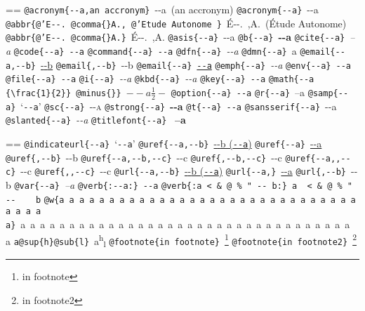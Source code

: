 \documentclass{book}
\makeatletter
\newcommand\Texinfocommandstyletextcite[1]{{\normalfont{}\textsl{#1}}}%
\newcommand\Texinfocommandstyletextkbd[1]{{\ttfamily\textsl{#1}}}%
\newcommand\Texinfocommandstyletextvar[1]{{\normalfont{}\textsl{#1}}}%
\newenvironment{Texinfopreformatted}{%
  \par\GNUTobeylines\obeyspaces\frenchspacing\parskip=\z@\parindent=\z@}{}
{\catcode`\^^M=13 \gdef\GNUTobeylines{\catcode`\^^M=13 \def^^M{\null\par}}}
\newenvironment{Texinfoindented}{\begin{list}{}{}\item\relax}{\end{list}}
\renewcommand{\_}{\Texinfounderscore\discretionary{}{}{}}
\makeatother
\begin{document}
\begin{Texinfoindented}
\begin{Texinfopreformatted}
\texttt{@acronym\{{-}{-}a,an accronym\}}\ {-}{-}a\ (an accronym)
\texttt{@acronym\{{-}{-}a\}}\ {-}{-}a
\texttt{@abbr\{@'E{-}{-}.\ @comma\{\}A.,\ @'Etude Autonome \}}\ \'{E}{-}{-}.\@\ ,A.\@\ (\'{E}tude Autonome)
\texttt{@abbr\{@'E{-}{-}.\ @comma\{\}A.\}}\ \'{E}{-}{-}.\@\ ,A.\@
\texttt{@asis\{{-}{-}a\}}\ {-}{-}a
\texttt{@b\{{-}{-}a\}}\ \textbf{{-}{-}a}
\texttt{@cite\{{-}{-}a\}}\ \Texinfocommandstyletextcite{--a}
\texttt{@code\{{-}{-}a\}}\ \texttt{{-}{-}a}
\texttt{@command\{{-}{-}a\}}\ \texttt{{-}{-}a}
\texttt{@dfn\{{-}{-}a\}}\ \textsl{{-}{-}a}
\texttt{@dmn\{{-}{-}a\}}\ \thinspace {-}{-}a
\texttt{@email\{{-}{-}a,{-}{-}b\}}\ \href{mailto:--a}{{-}{-}b}
\texttt{@email\{,{-}{-}b\}}\ {-}{-}b
\texttt{@email\{{-}{-}a\}}\ \href{mailto:--a}{\nolinkurl{--a}}
\texttt{@emph\{{-}{-}a\}}\ \emph{{-}{-}a}
\texttt{@env\{{-}{-}a\}}\ \texttt{{-}{-}a}
\texttt{@file\{{-}{-}a\}}\ \texttt{{-}{-}a}
\texttt{@i\{{-}{-}a\}}\ \textit{{-}{-}a}
\texttt{@kbd\{{-}{-}a\}}\ \Texinfocommandstyletextkbd{{-}{-}a}
\texttt{@key\{{-}{-}a\}}\ \texttt{{-}{-}a}
\texttt{@math\{{-}{-}a \{\textbackslash{}frac\{1\}\{2\}\}\ @minus\{\}\}}\ $--a {\frac{1}{2}} -$
\texttt{@option\{{-}{-}a\}}\ \texttt{{-}{-}a}
\texttt{@r\{{-}{-}a\}}\ \textnormal{--a}
\texttt{@samp\{{-}{-}a\}}\ `\texttt{{-}{-}a}'
\texttt{@sc\{{-}{-}a\}}\ \textsc{{-}{-}a}
\texttt{@strong\{{-}{-}a\}}\ \textbf{{-}{-}a}
\texttt{@t\{{-}{-}a\}}\ \texttt{{-}{-}a}
\texttt{@sansserif\{{-}{-}a\}}\ \textsf{{-}{-}a}
\texttt{@slanted\{{-}{-}a\}}\ \textsl{{-}{-}a}
\texttt{@titlefont\{{-}{-}a\}}\ \end{Texinfopreformatted}
{\huge \bfseries --a}\begin{Texinfopreformatted}%
\ttfamily 
\texttt{@indicateurl\{{-}{-}a\}}\ `\texttt{{-}{-}a}'
\texttt{@uref\{{-}{-}a,{-}{-}b\}}\ \href{--a}{{-}{-}b (\nolinkurl{--a})}
\texttt{@uref\{{-}{-}a\}}\ \url{--a}
\texttt{@uref\{,{-}{-}b\}}\ {-}{-}b
\texttt{@uref\{{-}{-}a,{-}{-}b,{-}{-}c\}}\ {-}{-}c
\texttt{@uref\{,{-}{-}b,{-}{-}c\}}\ {-}{-}c
\texttt{@uref\{{-}{-}a{,}{,}{-}{-}c\}}\ {-}{-}c
\texttt{@uref\{{,}{,}{-}{-}c\}}\ {-}{-}c
\texttt{@url\{{-}{-}a,{-}{-}b\}}\ \href{--a}{{-}{-}b (\nolinkurl{--a})}
\texttt{@url\{{-}{-}a,\}}\ \url{--a}
\texttt{@url\{,{-}{-}b\}}\ {-}{-}b
\texttt{@var\{{-}{-}a\}}\ \Texinfocommandstyletextvar{--a}
\texttt{@verb\{:{-}{-}a:\}}\ \verb:--a:
\texttt{@verb\{:a  < \& @\ \% " {-}{-}    b:\}}\ \verb:a  < & @ % " --    b:
\texttt{@w\{a a a a a a a a a a a a a a a a a a a a a a a a a a a a a a a a a a a\}}\ \hbox{a a a a a a a a a a a a a a a a a a a a a a a a a a a a a a a a a a a}
\texttt{a@sup\{h\}@sub\{l\}}\ a\textsuperscript{h}\textsubscript{l}
\texttt{@footnote\{in footnote\}}\ \footnote{in footnote}
\texttt{@footnote\{in footnote2\}}\ \footnote{in footnote2}


\end{Texinfopreformatted}
\end{Texinfoindented}
\end{document}
